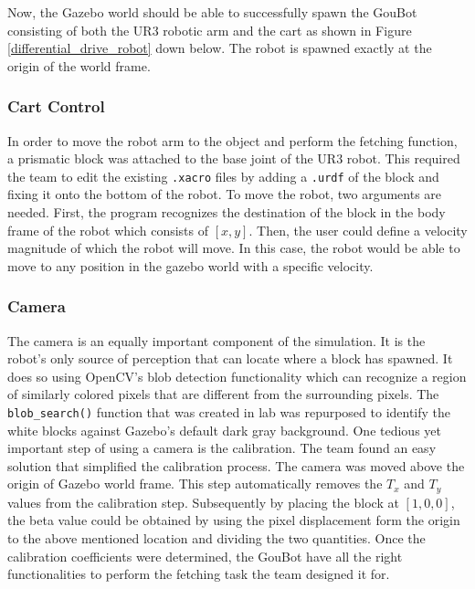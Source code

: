             Now, the Gazebo world should be able to successfully spawn the GouBot consisting of both the UR3 robotic arm and the cart as shown in Figure \ref{differential_drive_robot} down below. The robot is spawned exactly at the origin of the world frame. 
    
        \subsubsection*{Cart Control}
    
            In order to move the robot arm to the object and perform the fetching function, a prismatic block was attached to the base joint of the UR3 robot. This required the team to edit the existing \lstinline!.xacro! files by adding a \lstinline!.urdf! of the block and fixing it onto the bottom of the robot. To move the robot, two arguments are needed. First, the program recognizes the destination of the block in the body frame of the robot which consists of $[x,y]$. Then, the user could define a velocity magnitude of which the robot will move. In this case, the robot would be able to move to any position in the gazebo world with a specific velocity.
        
        \subsubsection*{Camera}
        
            The camera is an equally important component of the simulation. It is the robot's only source of perception that can locate where a block has spawned. It does so using OpenCV's blob detection functionality which can recognize a region of similarly colored pixels that are different from the surrounding pixels. The \lstinline!blob_search()! function that was created in lab was repurposed to identify the white blocks against Gazebo's default dark gray background. One tedious yet important step of using a camera is the calibration. The team found an easy solution that simplified the calibration process. The camera was moved above the origin of Gazebo world frame. This step automatically removes the $T_x$ and $T_y$ values from the calibration step. Subsequently by placing the block at $[1,0,0]$, the beta value could be obtained by using the pixel displacement form the origin to the above mentioned location and dividing the two quantities. Once the calibration coefficients were determined, the GouBot have all the right functionalities to perform the fetching task the team designed it for. 
    
